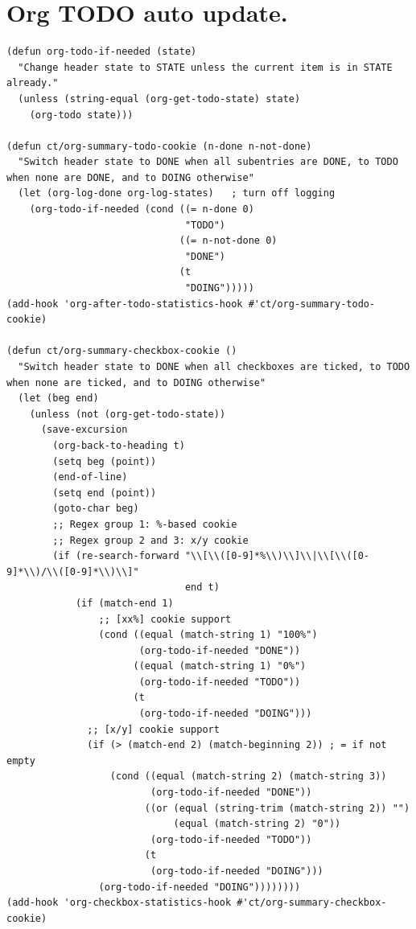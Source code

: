 \documentclass[11pt]{article}
\begin{document}
\section{Org TODO auto update.}
\label{sec:orga118731}
\begin{verbatim}
(defun org-todo-if-needed (state)
  "Change header state to STATE unless the current item is in STATE already."
  (unless (string-equal (org-get-todo-state) state)
    (org-todo state)))

(defun ct/org-summary-todo-cookie (n-done n-not-done)
  "Switch header state to DONE when all subentries are DONE, to TODO when none are DONE, and to DOING otherwise"
  (let (org-log-done org-log-states)   ; turn off logging
    (org-todo-if-needed (cond ((= n-done 0)
                               "TODO")
                              ((= n-not-done 0)
                               "DONE")
                              (t
                               "DOING")))))
(add-hook 'org-after-todo-statistics-hook #'ct/org-summary-todo-cookie)

(defun ct/org-summary-checkbox-cookie ()
  "Switch header state to DONE when all checkboxes are ticked, to TODO when none are ticked, and to DOING otherwise"
  (let (beg end)
    (unless (not (org-get-todo-state))
      (save-excursion
        (org-back-to-heading t)
        (setq beg (point))
        (end-of-line)
        (setq end (point))
        (goto-char beg)
        ;; Regex group 1: %-based cookie
        ;; Regex group 2 and 3: x/y cookie
        (if (re-search-forward "\\[\\([0-9]*%\\)\\]\\|\\[\\([0-9]*\\)/\\([0-9]*\\)\\]"
                               end t)
            (if (match-end 1)
                ;; [xx%] cookie support
                (cond ((equal (match-string 1) "100%")
                       (org-todo-if-needed "DONE"))
                      ((equal (match-string 1) "0%")
                       (org-todo-if-needed "TODO"))
                      (t
                       (org-todo-if-needed "DOING")))
              ;; [x/y] cookie support
              (if (> (match-end 2) (match-beginning 2)) ; = if not empty
                  (cond ((equal (match-string 2) (match-string 3))
                         (org-todo-if-needed "DONE"))
                        ((or (equal (string-trim (match-string 2)) "")
                             (equal (match-string 2) "0"))
                         (org-todo-if-needed "TODO"))
                        (t
                         (org-todo-if-needed "DOING")))
                (org-todo-if-needed "DOING"))))))))
(add-hook 'org-checkbox-statistics-hook #'ct/org-summary-checkbox-cookie)
\end{verbatim}
\end{document}
